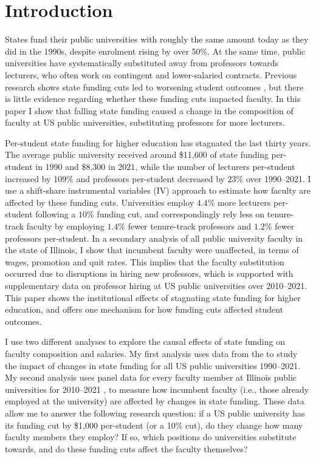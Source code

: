 \section{Introduction}
\label{sec:intro}
States fund their public universities with roughly the same amount today as they did in the 1990s, despite enrolment rising by over 50\%.
At the same time, public universities have systematically substituted away from professors towards lecturers, who often work on contingent and lower-salaried contracts.
Previous research shows state funding cuts led to worsening student outcomes \citep{NBERw23736,NBERw27885}, but there is little evidence regarding whether these funding cuts impacted faculty.
In this paper I show that falling state funding caused a change in the composition of faculty at US public universities, substituting professors for more lecturers.

Per-student state funding for higher education has stagnated the last thirty years.
The average public university received around \$11,600 of state funding per-student in 1990 and \$8,300 in 2021, while the number of lecturers per-student increased by 109\% and professors per-student decreased by $23$\% over 1990--2021.
I use a shift-share instrumental variables (IV) approach to estimate how faculty are affected by these funding cuts.
Universities employ $4.4$\% more lecturers per-student following a $10$\% funding cut, and correspondingly rely less on tenure-track faculty by employing $1.4$\% fewer tenure-track professors and $1.2$\% fewer professors per-student.
In a secondary analysis of all public university faculty in the state of Illinois, I show that incumbent faculty were unaffected, in terms of wages, promotion and quit rates.
This implies that the faculty substitution occurred due to disruptions in hiring new professors, which is supported with supplementary data on professor hiring at US public universities over 2010--2021.
This paper shows the institutional effects of stagnating state funding for higher education, and offers one mechanism for how funding cuts affected student outcomes.

I use two different analyses to explore the causal effects of state funding on faculty composition and salaries.
My first analysis uses data from the \citet[IPEDS]{ipeds} to study the impact of changes in state funding for all US public universities 1990--2021.
My second analysis uses panel data for every faculty member at Illinois public universities for 2010--2021 \citet[IBHED]{ibhed}, to measure how incumbent faculty (i.e., those already employed at the university) are affected by changes in state funding.
These data allow me to answer the following research question: if a US public university has its funding cut by \$1,000 per-student (or a 10\% cut), do they change how many faculty members they employ?
If so, which positions do universities substitute towards, and do these funding cuts affect the faculty themselves?

